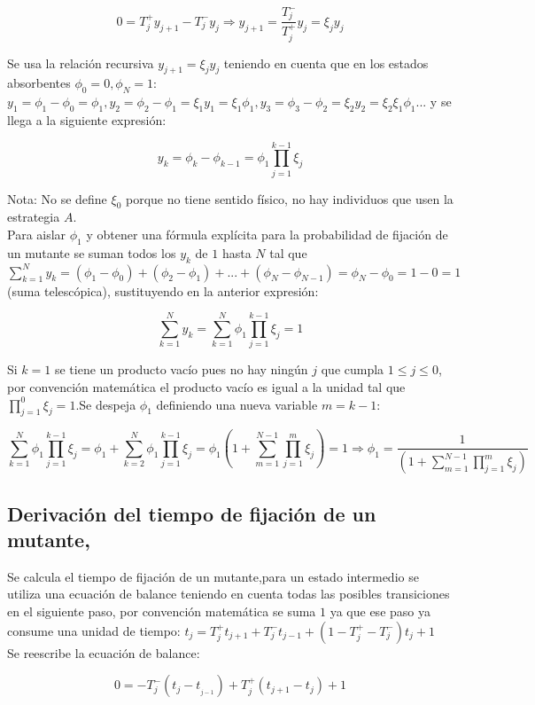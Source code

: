\documentclass[%
 sor,
 jor,
 amsmath,amssymb,
 reprint,%
]{revtex4-2}
\begin{document}
\[
0=T_j^+y_{j+1}-T_j^-y_j \Rightarrow y_{j+1}=\frac{T_j^-}{T_j^+}y_j=\xi_j y_j
\]

Se usa la relación recursiva \(y_{j+1}=\xi_j y_j\) teniendo en cuenta que en los estados absorbentes \(\phi_0=0,\phi_N=1\): \(y_1=\phi_1-\phi_0=\phi_1,y_2=\phi_2-\phi_1=\xi_1 y_1=\xi_1 \phi_1,y_3=\phi_3-\phi_2=\xi_2y_2=\xi_2 \xi_1\phi_1...\) y se llega a la siguiente expresión:

\[
y_k=\phi_k-\phi_{k-1}=\phi_1 \prod_{j=1}^{k-1} \xi_j
\]

Nota: No se define \(\xi_0\) porque no tiene sentido físico, no hay individuos que usen la estrategia \(A\).\\

Para aislar $\phi_1$ y obtener una fórmula explícita para la probabilidad de fijación de un mutante se suman todos los \(y_k\) de $1$ hasta $N$ tal que \(\sum_{k=1}^{N}y_k=(\phi_1-\phi_0)+(\phi_2-\phi_1)+...+(\phi_N-\phi_{N-1})=\phi_N-\phi_0=1-0=1\) (suma telescópica), sustituyendo en la anterior expresión:

\[
\sum_{k=1}^{N}y_k=\sum_{k=1}^{N}\phi_1 \prod_{j=1}^{k-1} \xi_j=1 
\]

Si \(k=1\) se tiene un producto vacío pues no hay ningún \(j\) que cumpla \(1 \leq j \leq 0\), por convención matemática el producto vacío es igual a la unidad tal que \(\prod_{j=1}^{0}\xi_j=1\).Se despeja \(\phi_1\) definiendo una nueva variable \(m=k-1\):

\[
\sum_{k=1}^{N} \phi_1 \prod_{j=1}^{k-1} \xi_j=\phi_1+\sum_{k=2}^{N} \phi_1 \prod_{j=1}^{k-1}\xi_j=\phi_1\left(1+\sum_{m=1}^{N-1}\prod_{j=1}^{m}\xi_j \right)=1  \Rightarrow \phi_1=\frac{1}{\left(1+\sum_{m=1}^{N-1}\prod_{j=1}^{m}\xi_j \right)}
\]

\subsection{Derivación del tiempo de fijación de un mutante, \cite{Arne}}

Se calcula el tiempo de fijación de un mutante,para un estado intermedio se utiliza una ecuación de balance  teniendo en cuenta todas las posibles transiciones en el siguiente paso,  por convención matemática se suma \(1\) ya que ese paso ya consume una unidad de tiempo: \( t_j=T_j^+t_{j+1}+T_j^-t_{j-1}+(1-T_j^+-T_j^-)t_j +1\)\\ 

Se reescribe la ecuación de balance:

\[
0=-T_j^-(t_j-t_{_{j-1}})+T_j^+(t_{j+1}-t_j)+1
\]
\end{document}
